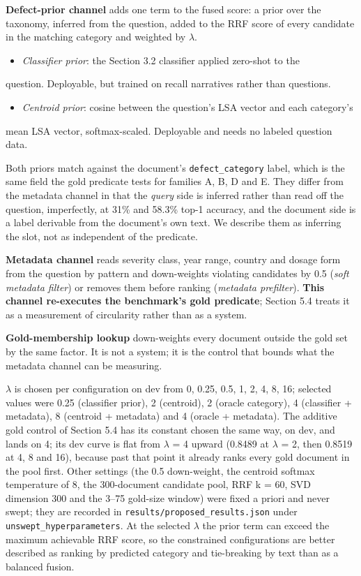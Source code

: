 \documentclass[acmsmall]{acmart}
\begin{document}
\textbf{Defect-prior channel} adds one term to the fused score: a prior over the taxonomy, inferred from the question, added to the RRF score of every candidate in the matching category and weighted by $\lambda$.

\begin{itemize}
\item \textit{Classifier prior}: the Section 3.2 classifier applied zero-shot to the
\end{itemize}

question. Deployable, but trained on recall narratives rather than questions.

\begin{itemize}
\item \textit{Centroid prior}: cosine between the question's LSA vector and each category's
\end{itemize}

mean LSA vector, softmax-scaled. Deployable and needs no labeled question data.

Both priors match against the document's \texttt{defect\_category} label, which is the same field the gold predicate tests for families A, B, D and E. They differ from the metadata channel in that the \textit{query} side is inferred rather than read off the question, imperfectly, at 31\% and 58.3\% top-1 accuracy, and the document side is a label derivable from the document's own text. We describe them as inferring the slot, not as independent of the predicate.

\textbf{Metadata channel} reads severity class, year range, country and dosage form from the question by pattern and down-weights violating candidates by 0.5 (\textit{soft metadata filter}) or removes them before ranking (\textit{metadata prefilter}). \textbf{This channel re-executes the benchmark's gold predicate}; Section 5.4 treats it as a measurement of circularity rather than as a system.

\textbf{Gold-membership lookup} down-weights every document outside the gold set by the same factor. It is not a system; it is the control that bounds what the metadata channel can be measuring.

$\lambda$ is chosen per configuration on dev from {0, 0.25, 0.5, 1, 2, 4, 8, 16}; selected values were 0.25 (classifier prior), 2 (centroid), 2 (oracle category), 4 (classifier + metadata), 8 (centroid + metadata) and 4 (oracle + metadata). The additive gold control of Section 5.4 has its constant chosen the same way, on dev, and lands on 4; its dev curve is flat from $\lambda$ = 4 upward (0.8489 at $\lambda$ = 2, then 0.8519 at 4, 8 and 16), because past that point it already ranks every gold document in the pool first. Other settings (the 0.5 down-weight, the centroid softmax temperature of 8, the 300-document candidate pool, RRF k = 60, SVD dimension 300 and the 3--75 gold-size window) were fixed a priori and never swept; they are recorded in \texttt{results/proposed\_\allowbreak{}results.json} under \texttt{unswept\_hyperparameters}. At the selected $\lambda$ the prior term can exceed the maximum achievable RRF score, so the constrained configurations are better described as ranking by predicted category and tie-breaking by text than as a balanced fusion.
\end{document}
